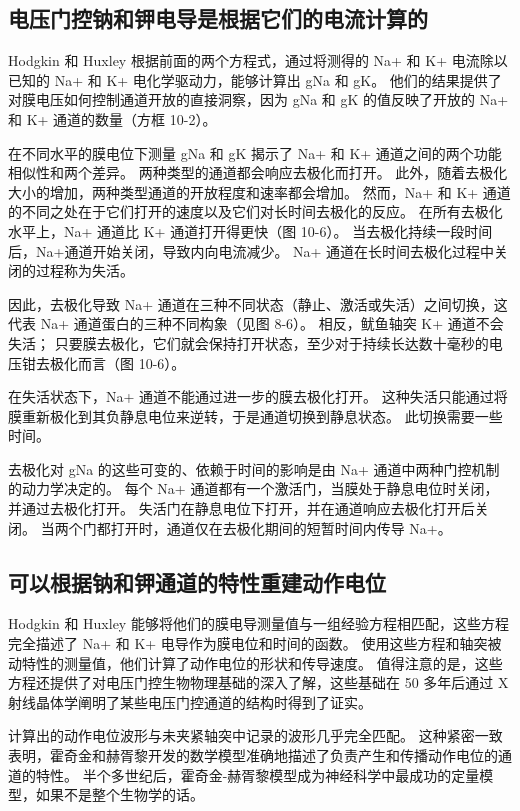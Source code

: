 \subsection{电压门控钠和钾电导是根据它们的电流计算的}
Hodgkin 和 Huxley 根据前面的两个方程式，通过将测得的 Na+ 和 K+ 电流除以已知的 Na+ 和 K+ 电化学驱动力，能够计算出 gNa 和 gK。 他们的结果提供了对膜电压如何控制通道开放的直接洞察，因为 gNa 和 gK 的值反映了开放的 Na+ 和 K+ 通道的数量（方框 10-2）。

在不同水平的膜电位下测量 gNa 和 gK 揭示了 Na+ 和 K+ 通道之间的两个功能相似性和两个差异。 两种类型的通道都会响应去极化而打开。 此外，随着去极化大小的增加，两种类型通道的开放程度和速率都会增加。 然而，Na+ 和 K+ 通道的不同之处在于它们打开的速度以及它们对长时间去极化的反应。 在所有去极化水平上，Na+ 通道比 K+ 通道打开得更快（图 10-6）。 当去极化持续一段时间后，Na+通道开始关闭，导致内向电流减少。 Na+ 通道在长时间去极化过程中关闭的过程称为失活。

因此，去极化导致 Na+ 通道在三种不同状态（静止、激活或失活）之间切换，这代表 Na+ 通道蛋白的三种不同构象（见图 8-6）。 相反，鱿鱼轴突 K+ 通道不会失活； 只要膜去极化，它们就会保持打开状态，至少对于持续长达数十毫秒的电压钳去极化而言（图 10-6）。

在失活状态下，Na+ 通道不能通过进一步的膜去极化打开。 这种失活只能通过将膜重新极化到其负静息电位来逆转，于是通道切换到静息状态。 此切换需要一些时间。

去极化对 gNa 的这些可变的、依赖于时间的影响是由 Na+ 通道中两种门控机制的动力学决定的。 每个 Na+ 通道都有一个激活门，当膜处于静息电位时关闭，并通过去极化打开。 失活门在静息电位下打开，并在通道响应去极化打开后关闭。 当两个门都打开时，通道仅在去极化期间的短暂时间内传导 Na+。


\subsection{可以根据钠和钾通道的特性重建动作电位}

Hodgkin 和 Huxley 能够将他们的膜电导测量值与一组经验方程相匹配，这些方程完全描述了 Na+ 和 K+ 电导作为膜电位和时间的函数。 使用这些方程和轴突被动特性的测量值，他们计算了动作电位的形状和传导速度。 值得注意的是，这些方程还提供了对电压门控生物物理基础的深入了解，这些基础在 50 多年后通过 X 射线晶体学阐明了某些电压门控通道的结构时得到了证实。

计算出的动作电位波形与未夹紧轴突中记录的波形几乎完全匹配。 这种紧密一致表明，霍奇金和赫胥黎开发的数学模型准确地描述了负责产生和传播动作电位的通道的特性。 半个多世纪后，霍奇金-赫胥黎模型成为神经科学中最成功的定量模型，如果不是整个生物学的话。

